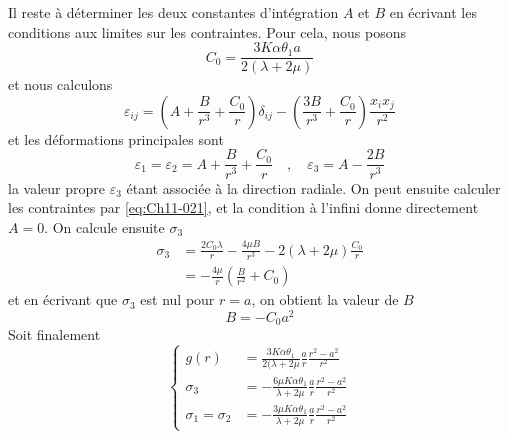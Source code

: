 Il reste à déterminer les deux constantes d'intégration $A$ et $B$ en écrivant les conditions aux limites sur les contraintes.
Pour cela, nous posons 
\begin{equation}
    C_0 = \frac{3K\alpha\theta_1 a}{2(\lambda + 2\mu)}
    \label{eq:Ch11-046}
\end{equation}
et nous calculons 
\begin{equation}
    \varepsilon_{ij}=\left(A+\frac{B}{r^3}+\frac{C_0}{r}\right)\delta_{ij}-\left(\frac{3B}{r^3}+\frac{C_0}{r}\right)\frac{x_ix_j}{r^2}
    \label{eq:Ch11-047}
\end{equation}
et les déformations principales sont 
\begin{equation}
    \varepsilon_1 = \varepsilon_2 = A + \frac{B}{r^3} + \frac{C_0}{r} \quad,\quad \varepsilon_3 = A - \frac{2B}{r^3}
    \label{eq:Ch11-048}
\end{equation}
la valeur propre $\varepsilon_3$ étant associée à la direction radiale.
On peut ensuite calculer les contraintes par \eqref{eq:Ch11-021}, et la condition à l'infini donne directement $A= 0$.
On calcule ensuite $\sigma_3$ 
\begin{equation}
  \begin{aligned}
    \sigma_3 & = \frac{2C_0\lambda}{r} - \frac{4\mu B}{r^3} - 2(\lambda+2\mu)\frac{C_0}{r} \\
             & = - \frac{4\mu}{r}\left(\frac{B}{r^2}+C_0\right)
  \end{aligned}
    \label{eq:Ch11-049}
\end{equation}
et en écrivant que $\sigma_3$ est nul pour $r=a$, on obtient la valeur de $B$  
\begin{equation}
    B = - C_0 a^2
    \label{eq:Ch11-050}
\end{equation}
Soit finalement
\begin{equation}
  \left\{
  \begin{aligned}
    g(r)                & = \frac{3K\alpha \theta_1}{2(\lambda + 2\mu}\frac{a}{r}\frac{r^2-a^2}{r^2} \\
    \sigma_3            & = - \frac{6\mu K \alpha \theta_1}{\lambda + 2\mu} \frac{a}{r}\frac{r^2-a^2}{r^2}\\
    \sigma_1 = \sigma_2 & = - \frac{3\mu K \alpha \theta_1}{\lambda + 2\mu} \frac{a}{r}\frac{r^2-a^2}{r^2}
  \end{aligned}
  \right.
    \label{eq:Ch11-051}
\end{equation}
